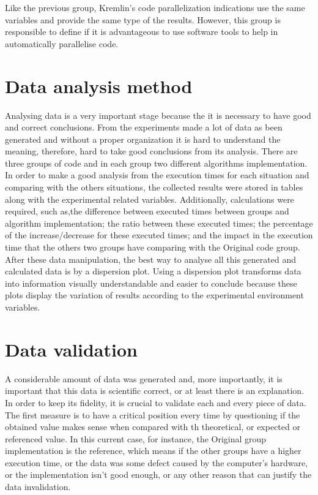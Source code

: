 Like the previous group, Kremlin's code parallelization indications use the same variables and provide the same type of the results. However, this group is responsible to define if it is advantageous to use software tools to help in automatically parallelise code. 


\section{Data analysis method}

Analysing data is a very important stage because the it is necessary to have good and correct conclusions. From the experiments made a lot of data as been generated and without a proper organization it is hard to understand the meaning, therefore, hard to take good conclusions from its analysis. There are three groups of code and in each group two different algorithms implementation. In order to make a good analysis from the execution times for each situation and comparing with the others situations, the collected results were stored in tables along with the experimental related variables. Additionally, calculations were required, such as,the difference between executed times between groups and algorithm implementation; the ratio between these executed times; the percentage of the increase/decrease for these executed times; and the impact in the execution time that the others two groups have comparing with the Original code group. After these data manipulation, 
the best way to analyse all this generated and calculated data is by a dispersion plot. Using a dispersion plot transforms data into information visually understandable and easier to conclude because these plots display the variation of results according to the experimental environment variables.


\section{Data validation}

A considerable amount of data was generated and, more importantly, it is important that this data is scientific correct, or at least there is an explanation. In order to keep its fidelity, it is crucial to validate each and every piece of data. The first measure is to have a critical position every time by questioning if the obtained value makes sense when compared with th theoretical, or expected or referenced value. In this current case, for instance, the Original group implementation is the reference, which means if the other groups have a higher execution time, or the data was some defect caused by the computer's hardware, or the implementation isn't good enough, or any other reason that can justify the data invalidation.

